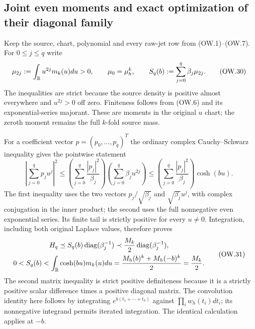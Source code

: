 \subsection{Joint even moments and exact optimization of their diagonal family}

Keep the source, chart, polynomial and every raw-jet row from (OW.1)--(OW.7).
For $0\le j\le q$ write
\[
 \mu_{2j}:=\int_\mathbb R u^{2j}m_k(u)du>0,\qquad
 \mu_0=\mu_h^k,\qquad
 S_q(b):=\sum_{j=0}^q\beta_j\mu_{2j}.
 \tag{OW.30}
\]
The inequalities are strict because the source density is positive almost
everywhere and $u^{2j}>0$ off zero. Finiteness follows from (OW.6) and its
exponential-series majorant. These are moments in the original $u$ chart;
the zeroth moment remains the full $k$-fold source mass.

For a coefficient vector $p=(p_0,\ldots,p_q)^T$ the ordinary complex
Cauchy--Schwarz inequality gives the pointwise statement
\[
 \left|\sum_{j=0}^qp_ju^j\right|^2
 \le\left(\sum_{j=0}^q\frac{|p_j|^2}{\beta_j}\right)
      \left(\sum_{j=0}^q\beta_j u^{2j}\right)
 \le\left(\sum_{j=0}^q\frac{|p_j|^2}{\beta_j}\right)\cosh(bu).
\]
The first inequality uses the two vectors $p_j/\sqrt{\beta_j}$ and
$\sqrt{\beta_j}u^j$, with complex conjugation in the inner product;
the second uses the full nonnegative even exponential series.
Its finite tail is strictly positive for every $u\ne0$. Integration,
including both original Laplace values, therefore proves
\[
 \begin{gathered}
 H_q\preceq S_q(b)\operatorname{diag}(\beta_j^{-1})
       \prec\frac{M_k}{2}\operatorname{diag}(\beta_j^{-1}),\\
 0<S_q(b)<\int_\mathbb R\cosh(bu)m_k(u)du
   =\frac{M_h(b)^k+M_h(-b)^k}{2}=\frac{M_k}{2}.
 \end{gathered}                                                \tag{OW.31}
\]
The second matrix inequality is strict positive definiteness because it
is a strictly positive scalar difference times a positive diagonal matrix.
The convolution identity here follows by integrating $e^{b(t_1+\cdots+t_k)}$
against $\prod_iw_h(t_i)dt_i$; its nonnegative integrand permits iterated
integration. The identical calculation applies at $-b$.


